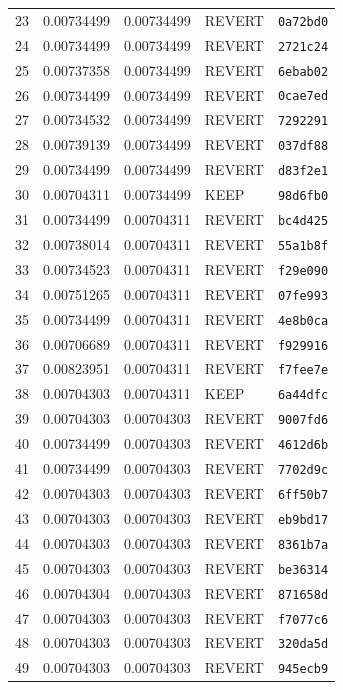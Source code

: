 \begin{longtable}{rrrll}
23 & 0.00734499 & 0.00734499 & REVERT & \texttt{0a72bd0} \\
24 & 0.00734499 & 0.00734499 & REVERT & \texttt{2721c24} \\
25 & 0.00737358 & 0.00734499 & REVERT & \texttt{6ebab02} \\
26 & 0.00734499 & 0.00734499 & REVERT & \texttt{0cae7ed} \\
27 & 0.00734532 & 0.00734499 & REVERT & \texttt{7292291} \\
28 & 0.00739139 & 0.00734499 & REVERT & \texttt{037df88} \\
29 & 0.00734499 & 0.00734499 & REVERT & \texttt{d83f2e1} \\
30 & 0.00704311 & 0.00734499 & KEEP & \texttt{98d6fb0} \\
31 & 0.00734499 & 0.00704311 & REVERT & \texttt{bc4d425} \\
32 & 0.00738014 & 0.00704311 & REVERT & \texttt{55a1b8f} \\
33 & 0.00734523 & 0.00704311 & REVERT & \texttt{f29e090} \\
34 & 0.00751265 & 0.00704311 & REVERT & \texttt{07fe993} \\
35 & 0.00734499 & 0.00704311 & REVERT & \texttt{4e8b0ca} \\
36 & 0.00706689 & 0.00704311 & REVERT & \texttt{f929916} \\
37 & 0.00823951 & 0.00704311 & REVERT & \texttt{f7fee7e} \\
38 & 0.00704303 & 0.00704311 & KEEP & \texttt{6a44dfc} \\
39 & 0.00704303 & 0.00704303 & REVERT & \texttt{9007fd6} \\
40 & 0.00734499 & 0.00704303 & REVERT & \texttt{4612d6b} \\
41 & 0.00734499 & 0.00704303 & REVERT & \texttt{7702d9c} \\
42 & 0.00704303 & 0.00704303 & REVERT & \texttt{6ff50b7} \\
43 & 0.00704303 & 0.00704303 & REVERT & \texttt{eb9bd17} \\
44 & 0.00704303 & 0.00704303 & REVERT & \texttt{8361b7a} \\
45 & 0.00704303 & 0.00704303 & REVERT & \texttt{be36314} \\
46 & 0.00704304 & 0.00704303 & REVERT & \texttt{871658d} \\
47 & 0.00704303 & 0.00704303 & REVERT & \texttt{f7077c6} \\
48 & 0.00704303 & 0.00704303 & REVERT & \texttt{320da5d} \\
49 & 0.00704303 & 0.00704303 & REVERT & \texttt{945ecb9} \\

\end{longtable}
